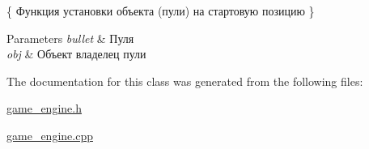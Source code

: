 \{ Функция установки объекта (пули) на стартовую позицию \} 


\begin{DoxyParams}{Parameters}
{\em bullet} & Пуля \\
\hline
{\em obj} & Объект владелец пули \\
\hline
\end{DoxyParams}


The documentation for this class was generated from the following files\+:\begin{DoxyCompactItemize}
\item 
\mbox{\hyperlink{game__engine_8h}{game\+\_\+engine.\+h}}\item 
\mbox{\hyperlink{game__engine_8cpp}{game\+\_\+engine.\+cpp}}\end{DoxyCompactItemize}
